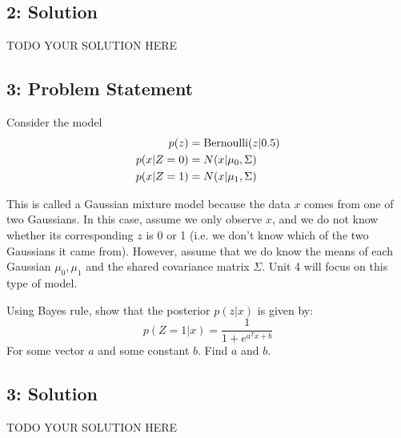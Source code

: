 \documentclass[10pt]{article}
\newcommand{\officialdirections}[1]{{\color{purple} #1}}
\begin{document}
\subsection{2: Solution}
TODO YOUR SOLUTION HERE



\newpage
\officialdirections{
\subsection*{3: Problem Statement}
Consider the model
\begin{align*}
p(z) &= \textnormal{Bernoulli}(z|0.5)\\
p(x|Z=0) &= N(x|\mu_0,\Sigma)\\
p(x|Z=1) &= N(x|\mu_1,\Sigma)
\end{align*}

This is called a Gaussian mixture model because the data $x$ comes from one of two Gaussians. In this case, assume we only observe $x$, and we do not know whether its corresponding $z$ is 0 or 1 (i.e. we don't know which of the two Gaussians it came from). However, assume that we do know the means of each Gaussian $\mu_0,\mu_1$ and the shared covariance matrix $\Sigma$. Unit 4 will focus on this type of model.

Using Bayes rule, show that the posterior $p(z|x)$ is given by:
\begin{equation*}
p(Z=1|x) = \frac{1}{1 + e^{a^T x + b}}
\end{equation*}
For some vector $a$ and some constant $b$. Find $a$ and $b$. 
}

\subsection{3: Solution}

TODO YOUR SOLUTION HERE
\end{document}
